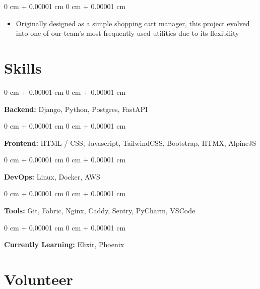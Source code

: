 \documentclass[10pt, letterpaper]{article}
\newenvironment{highlights}{
    \begin{itemize}[
        topsep=0.10 cm,
        parsep=0.10 cm,
        partopsep=0pt,
        itemsep=0pt,
        leftmargin=0 cm + 10pt
    ]
}{
    \end{itemize}
} %
\newenvironment{onecolentry}{
    \begin{adjustwidth}{
        0 cm + 0.00001 cm
    }{
        0 cm + 0.00001 cm
    }
}{
    \end{adjustwidth}
} %
\begin{document}
        \vspace{0.10 cm}
        \begin{onecolentry}
            \begin{highlights}
                \item Originally designed as a simple shopping cart manager, this project evolved into one of our team's most frequently used utilities due to its flexibility
            \end{highlights}
        \end{onecolentry}



    
    \section{Skills}



        
        \begin{onecolentry}
            \textbf{Backend:} Django, Python, Postgres, FastAPI
        \end{onecolentry}

        \vspace{0.2 cm}

        \begin{onecolentry}
            \textbf{Frontend:} HTML / CSS, Javascript, TailwindCSS, Bootstrap, HTMX, AlpineJS
        \end{onecolentry}

        \vspace{0.2 cm}

        \begin{onecolentry}
            \textbf{DevOps:} Linux, Docker, AWS
        \end{onecolentry}

        \vspace{0.2 cm}

        \begin{onecolentry}
            \textbf{Tools:} Git, Fabric, Nginx, Caddy, Sentry, PyCharm, VSCode
        \end{onecolentry}

        \vspace{0.2 cm}

        \begin{onecolentry}
            \textbf{Currently Learning:} Elixir, Phoenix
        \end{onecolentry}


    
    \section{Volunteer}
\end{document}
